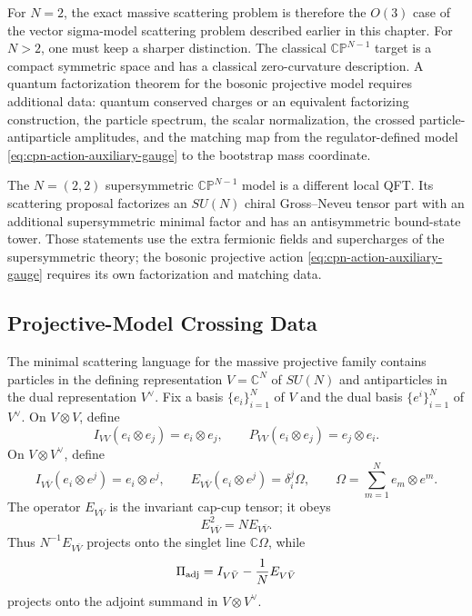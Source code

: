 For \(N=2\), the exact massive scattering problem is therefore the \(O(3)\)
case of the vector sigma-model scattering problem described earlier in this
chapter.
For \(N>2\), one must keep a sharper distinction.  The classical
\(\mathbb{CP}^{N-1}\) target is a compact symmetric space and has a classical
zero-curvature description.  A quantum factorization theorem for the bosonic
projective model requires additional data: quantum conserved charges or an
equivalent factorizing construction, the particle spectrum, the scalar
normalization, the crossed particle-antiparticle amplitudes, and the matching
map from the regulator-defined model
\eqref{eq:cpn-action-auxiliary-gauge} to the bootstrap mass coordinate.

The \(N=(2,2)\) supersymmetric \(\mathbb{CP}^{N-1}\) model is a different
local QFT.  Its scattering proposal factorizes an \(SU(N)\) chiral
Gross--Neveu tensor part with an additional supersymmetric minimal factor and
has an antisymmetric bound-state tower.  Those statements use the extra
fermionic fields and supercharges of the supersymmetric theory; the bosonic
projective action \eqref{eq:cpn-action-auxiliary-gauge} requires its own
factorization and matching data.

\subsection{Projective-Model Crossing Data}
\label{subsec:projective-model-crossing-data}

The minimal scattering language for the massive projective family contains
particles in the defining representation \(V=\mathbb C^N\) of \(SU(N)\) and
antiparticles in the dual representation \(V^\vee\).  Fix a basis
\(\{e_i\}_{i=1}^N\) of \(V\) and the dual basis \(\{e^i\}_{i=1}^N\) of
\(V^\vee\).  On \(V\otimes V\), define
\[
  I_{VV}(e_i\otimes e_j)=e_i\otimes e_j,\qquad
  P_{VV}(e_i\otimes e_j)=e_j\otimes e_i .
\]
On \(V\otimes V^\vee\), define
\begin{equation}
  I_{V\bar V}(e_i\otimes e^j)=e_i\otimes e^j,\qquad
  E_{V\bar V}(e_i\otimes e^j)
  =
  \delta_i^j\Omega,\qquad
  \Omega=\sum_{m=1}^N e_m\otimes e^m .
  \label{eq:projective-annihilation-operator}
\end{equation}
The operator \(E_{V\bar V}\) is the invariant cap-cup tensor; it obeys
\begin{equation}
  E_{V\bar V}^2=N E_{V\bar V}.
  \label{eq:projective-annihilation-idempotent}
\end{equation}
Thus \(N^{-1}E_{V\bar V}\) projects onto the singlet line
\(\mathbb C\Omega\), while
\begin{equation}
  \Pi_{\rm adj}=I_{V\bar V}-\frac1N E_{V\bar V}
  \label{eq:projective-adjoint-projector}
\end{equation}
projects onto the adjoint summand in \(V\otimes V^\vee\).


